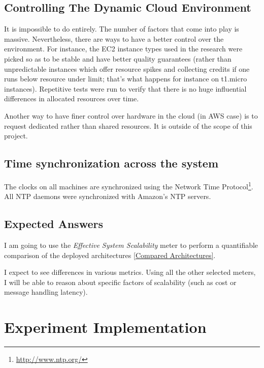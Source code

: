\documentclass{uvamscse}
\begin{document}
\section{Controlling The Dynamic Cloud Environment}
It is impossible to do entirely. The number of factors that come into play is massive. Nevertheless, there are ways to have a better control over the environment. For instance, the EC2 instance types used in the research were picked so as to  be stable and have better quality guarantees (rather than unpredictable instances which offer resource spikes and collecting credits if one runs below resource under limit; that's what happens for instance on t1.micro instances). Repetitive tests were run to verify that there is no huge influential differences in allocated resources over time.

Another way to have finer control over hardware in the cloud (in AWS case) is to request dedicated rather than shared resources. It is outside of the scope of this project.

\section{Time synchronization across the system}\label{Time synchronization across the system}
The clocks on all machines are synchronized using the Network Time Protocol\footnote{\url{http://www.ntp.org/}}. All NTP daemons were synchronized with Amazon's NTP servers.

\section{Expected Answers}\label{Expected Answers}
I am going to use the \textit{Effective System Scalability} meter to perform a quantifiable comparison of the deployed architectures \ref{Compared Architectures}.

I expect to see differences in various metrics. Using all the other selected meters, I will be able to reason about specific factors of scalability (such as cost or message handling latency).


\chapter{Experiment Implementation} \label{Experiment Implementation}
\end{document}
